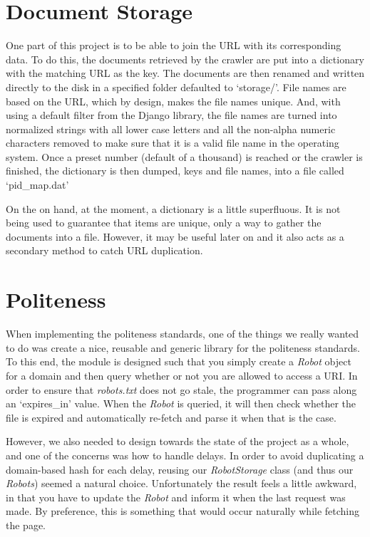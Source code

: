 \documentclass[letterpaper,11pt,twoside]{article}
\begin{document}
\section{Document Storage}
One part of this project is to be able to join the URL with its corresponding data. To do this, the documents retrieved by the crawler are put into a dictionary with the matching URL as the key. The documents are then renamed and written directly to the disk in a specified folder defaulted to ‘storage/’. File names are based on the URL, which by design, makes the file names unique. And, with using a default filter from the Django library, the file names are turned into normalized strings with all lower case letters and all the non-alpha numeric characters removed to make sure that it is a valid file name in the operating system. Once a preset number (default of a thousand) is reached or the crawler is finished, the dictionary is then dumped, keys and file names, into a file called ‘pid_map.dat’

On the on hand, at the moment, a dictionary is a little superfluous. It is not being used to guarantee that items are unique, only a way to gather the documents into a file. However, it may be useful later on and it also acts as a secondary method to catch URL duplication.

\section{Politeness}
When implementing the politeness standards, one of the things we really wanted to do was create a nice, reusable and generic library for the politeness standards. To this end, the module is designed such that you simply create a \emph{Robot} object for a domain and then query whether or not you are allowed to access a URI. In order to ensure that \emph{robots.txt} does not go stale, the programmer can pass along an `expires\_in' value. When the \emph{Robot} is queried, it will then check whether the file is expired and automatically re-fetch and parse it when that is the case.

However, we also needed to design towards the state of the project as a whole, and one of the concerns was how to handle delays. In order to avoid duplicating a domain-based hash for each delay, reusing our \emph{RobotStorage} class (and thus our \emph{Robots}) seemed a natural choice. Unfortunately the result feels a little awkward, in that you have to update the \emph{Robot} and inform it when the last request was made. By preference, this is something that would occur naturally while fetching the page.
\end{document}
